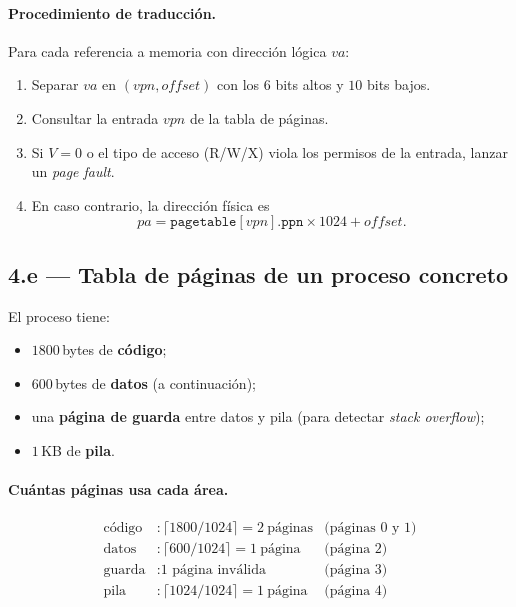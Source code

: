 \documentclass[11pt,a4paper]{article}
\begin{document}
\paragraph{Procedimiento de traducción.} Para cada referencia a
memoria con dirección lógica $\textit{va}$:

\begin{enumerate}[leftmargin=*,nosep]
    \item Separar $\textit{va}$ en $(\textit{vpn},\textit{offset})$
        con los $6$ bits altos y $10$ bits bajos.
    \item Consultar la entrada $\textit{vpn}$ de la tabla de páginas.
    \item Si $V=0$ o el tipo de acceso (R/W/X) viola los permisos de
        la entrada, lanzar un \emph{page fault}.
    \item En caso contrario, la dirección física es
        \[
        \textit{pa} = \texttt{pagetable}[\textit{vpn}].\texttt{ppn}
                      \times 1024 + \textit{offset}.
        \]
\end{enumerate}

\subsection{4.e --- Tabla de páginas de un proceso concreto}

El proceso tiene:

\begin{itemize}[leftmargin=*,nosep]
    \item $1800$\,bytes de \textbf{código};
    \item $600$\,bytes de \textbf{datos} (a continuación);
    \item una \textbf{página de guarda} entre datos y pila (para
        detectar \emph{stack overflow});
    \item $1$\,KB de \textbf{pila}.
\end{itemize}

\paragraph{Cuántas páginas usa cada área.}

\begin{align*}
\text{código} &: \lceil 1800/1024 \rceil = 2\ \text{páginas} & \text{(páginas 0 y 1)} \\
\text{datos}  &: \lceil 600/1024 \rceil  = 1\ \text{página} & \text{(página 2)} \\
\text{guarda} &: \text{1 página inválida}                     & \text{(página 3)} \\
\text{pila}   &: \lceil 1024/1024 \rceil = 1\ \text{página} & \text{(página 4)}
\end{align*}
\end{document}
